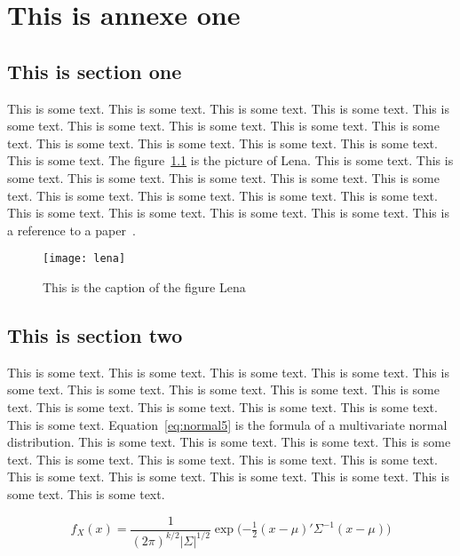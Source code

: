 \chapter{This is annexe one}


\section{This is section one}

This is some text. This is some text. This is some text. This is some text. This is some text. This is some text. This is some text. 
This is some text. This is some text. This is some text. This is some text. This is some text. This is some text. This is some text. 
The figure~\ref{fig:lena5} is the picture of Lena.
This is some text. This is some text. This is some text. This is some text. This is some text. This is some text. This is some text. 
This is some text. This is some text. This is some text. This is some text. This is some text. This is some text. This is some text. 
This is a reference to a paper~\cite{Garcia_2008_CVGPU}.

\begin{figure}[htbp]
    \centering
    \texttt{[image: lena]}
    \caption{This is the caption of the figure Lena}
    \label{fig:lena5}
\end{figure}


\section{This is section two}

This is some text. This is some text. This is some text. This is some text. This is some text. This is some text. This is some text. 
This is some text. This is some text. This is some text. This is some text. This is some text. This is some text. This is some text. 
Equation~\ref{eq:normal5} is the formula of a multivariate normal distribution.
This is some text. This is some text. This is some text. This is some text. This is some text. This is some text. This is some text. 
This is some text. This is some text. This is some text. This is some text. This is some text. This is some text. This is some text. 

\begin{equation}
    f_X(x) = \frac{1}{ (2\pi)^{k/2}|\Sigma|^{1/2} } \exp\!\Big( {-\tfrac{1}{2}}(x-\mu)'\Sigma^{-1}(x-\mu) \Big)
    \label{eq:normal5}
\end{equation}


